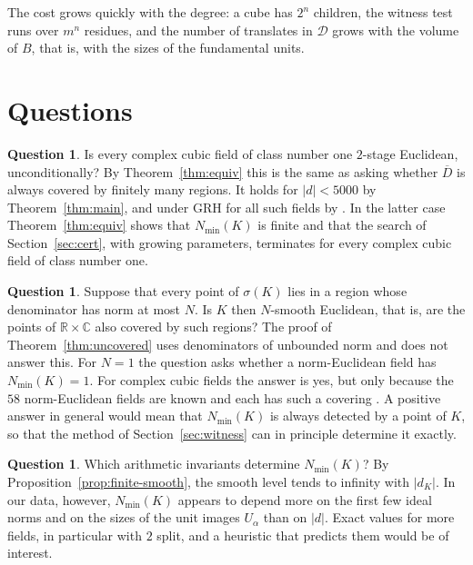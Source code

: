 \documentclass[11pt]{amsart}
\theoremstyle{definition}
\newtheorem{question}[theorem]{Question}
\theoremstyle{remark}
\numberwithin{equation}{section}
\newcommand{\R}{\mathbb{R}}
\newcommand{\C}{\mathbb{C}}
\newcommand{\Nmin}{N_{\min}}
\begin{document}
The cost grows quickly with the degree: a cube has $2^n$ children, the witness test runs over
$m^n$ residues, and the number of translates in $\mathcal D$ grows with the volume of $B$, that
is, with the sizes of the fundamental units.

\section{Questions}\label{sec:questions}

\begin{question}\label{q:converse}
Is every complex cubic field of class number one $2$-stage Euclidean, unconditionally? By
Theorem~\ref{thm:equiv} this is the same as asking whether $\overline D$ is always covered by
finitely many regions. It holds for $|d|<5000$ by Theorem~\ref{thm:main}, and under GRH for all
such fields by \cite{CW}. In the latter case Theorem~\ref{thm:equiv} shows that
$\Nmin(K)$ is finite and that the search of Section~\ref{sec:cert}, with growing parameters,
terminates for every complex cubic field of class number one.
\end{question}

\begin{question}\label{q:bounded}
Suppose that every point of $\sigma(K)$ lies in a region whose denominator has norm at most
$N$. Is $K$ then $N$-smooth Euclidean, that is, are the points of $\R\times\C$ also covered by
such regions? The proof of Theorem~\ref{thm:uncovered} uses denominators of unbounded norm and
does not answer this. For $N=1$ the question asks whether a norm-Euclidean field has
$\Nmin(K)=1$. For complex cubic fields the answer is yes, but only because the $58$
norm-Euclidean fields are known and each has such a covering \cite{CL,BBT}. A positive answer
in general would mean that $\Nmin(K)$ is always detected by a point of $K$, so that the method
of Section~\ref{sec:witness} can in principle determine it exactly.
\end{question}

\begin{question}
Which arithmetic invariants determine $\Nmin(K)$? By
Proposition~\ref{prop:finite-smooth}, the smooth level tends to infinity with $|d_K|$. In our data, however, $\Nmin(K)$ appears to depend more
on the first few ideal norms and on the sizes of the unit images $U_\alpha$ than on $|d|$.
Exact values for more fields, in particular with $2$ split, and a heuristic that predicts
them would be of interest.
\end{question}
\end{document}
